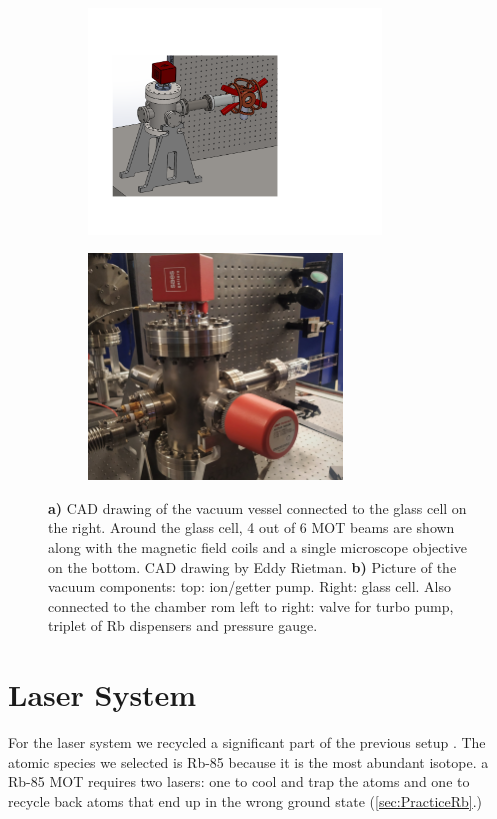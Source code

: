 \begin{figure}
	\begin{subfigure}{.54\linewidth}
		\centering
		\includegraphics[height=6cm]{figures/Vacuum.pdf}
		\caption{}
		\label{fig:VacuumSetup}
	\end{subfigure}
	\hfill
	\begin{subfigure}{.44\linewidth}
		\centering
		\includegraphics[height=6cm]{figures/Chamber.jpg}
		\caption{}
		\label{fig:Chamber}
	\end{subfigure}
	\caption{\textsf{\textbf{a)}} CAD drawing of the vacuum vessel connected to the glass cell on the right. 
	Around the glass cell, 4 out of 6 MOT beams are shown along with the magnetic field coils and a single microscope objective on the bottom. 
	CAD drawing by Eddy Rietman.
    \textsf{\textbf{b)}} Picture of the vacuum components: top: ion/getter pump. Right: glass cell. Also connected to the chamber rom left to right: valve for turbo pump, triplet of Rb dispensers and pressure gauge.}
\end{figure}

\section{Laser System}\label{sec:LaserSystem}

For the laser system we recycled a significant part of the previous setup \cite{Reijnders2010}.
The atomic species we selected is Rb-85 because it is the most abundant isotope. 
a Rb-85 MOT requires two lasers: one to cool and trap the atoms and one to recycle back atoms that end up in the wrong ground state (\cref{sec:PracticeRb}.)

